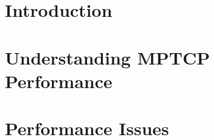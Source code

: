 \graphicspath{{figs/}}

\section{Introduction}


\section{Understanding MPTCP Performance}


\section{Performance Issues}

